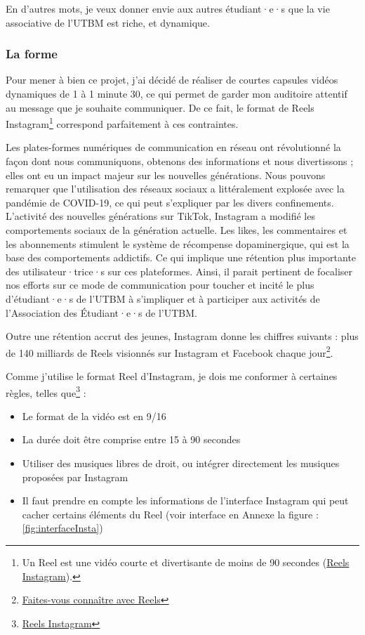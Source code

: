 En d'autres mots, je veux donner envie aux autres étudiant·e·s que la vie associative de l'UTBM est riche, et dynamique.

\subsubsection{La forme}

Pour mener à bien ce projet, j'ai décidé de réaliser de courtes capsules vidéos dynamiques de 1 à 1 minute 30, ce qui permet de garder mon auditoire attentif au message que je souhaite communiquer.
De ce fait, le format de Reels Instagram\footnote{Un Reel est une vidéo courte et divertisante de moins de 90 secondes (\href{https://about.instagram.com/fr-fr/features/reels}{Reels Instagram}).} correspond parfaitement à ces contraintes.

Les plates-formes numériques de communication en réseau ont révolutionné la façon dont nous communiquons, obtenons des informations et nous divertissons ; elles ont eu un impact majeur sur les nouvelles générations.
Nous pouvons remarquer que l'utilisation des réseaux sociaux a littéralement explosée avec la pandémie de COVID-19, ce qui peut s'expliquer par les divers confinements.
L'activité des nouvelles générations sur TikTok, Instagram a modifié les comportements sociaux de la génération actuelle.
Les likes, les commentaires et les abonnements stimulent le système de récompense dopaminergique, qui est la base des comportements addictifs\cite{pedrouzo2023hyperconnected}.
Ce qui implique une rétention plus importante des utilisateur·trice·s sur ces plateformes.
Ainsi, il parait pertinent de focaliser nos efforts sur ce mode de communication pour toucher et incité le plus d'étudiant·e·s de l'UTBM à s'impliquer et à participer aux activités de l'Association des Étudiant·e·s de l'UTBM.

Outre une rétention accrut des jeunes, Instagram donne les chiffres suivants : plus de 140 milliards de Reels visionnés sur Instagram et Facebook chaque jour\footnote{\href{https://business.instagram.com/instagram-reels?locale=fr_FR}{Faites-vous connaître avec Reels}}.

Comme j'utilise le format Reel d'Instagram, je dois me conformer à certaines règles, telles que\footnote{\href{https://about.instagram.com/fr-fr/features/reels}{Reels Instagram}} :
\begin{itemize}
    \item Le format de la vidéo est en 9/16
    \item La durée doit être comprise entre 15 à 90 secondes
    \item Utiliser des musiques libres de droit, ou intégrer directement les musiques proposées par Instagram
    \item Il faut prendre en compte les informations de l'interface Instagram qui peut cacher certains éléments du Reel (voir interface en Annexe la figure : \ref{fig:interfaceInsta})
\end{itemize}


